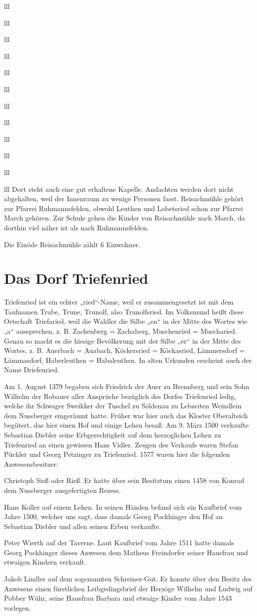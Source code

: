 \documentclass[12pt,a4pager]{book}
\begin{document}
\begin{tabuluar}{lll}
\begin{tabuluar}{lll}
\begin{tabuluar}{lll}
\begin{tabuluar}{lll}
\begin{tabuluar}{lll}
\begin{tabuluar}{lll}
\begin{tabuluar}{lll}
\begin{tabuluar}{lll}
\begin{tabuluar}{lll}
\begin{tabuluar}{lll}
\begin{tabuluar}{lll}
\begin{tabuluar}{lll}
Dort steht auch eine gut erhaltene Kapelle. Andachten werden dort nicht
abgehalten, weil der Innenraum zu wenige Personen fasst. Reisachmühle gehört zur
Pfarrei Ruhmannsfelden, obwohl Leuthen und Lobetsried schon zur Pfarrei March
gehören. Zur Schule gehen die Kinder von Reisachmühle nach March, da dorthin
viel näher ist als nach Ruhmannsfelden.

Die Einöde Reisachmühle zählt 6 Einwohner.

\section{Das Dorf Triefenried}

Triefenried ist ein echter „ried“-Name, weil er zusammengesetzt ist mit dem
Taufnamen Trube, Trune, Trunolf, also Trunolfsried. Im Volksmund heißt diese
Ortschaft Triefaried, weil die Waldler die Silbe „en“ in der Mitte des Wortes
wie „a“ aussprechen, z. B. Zachenberg = Zachaberg, Muschenried = Muscharied.
Genau so macht es die hiesige Bevölkerung mit der Silbe „er“ in der Mitte des
Wortes, z. B. Auerbach = Auabach, Köckersried = Köckasried, Lämmersdorf =
Lämmasdorf, Haberleuthen = Habaleuthen. In alten Urkunden erscheint auch der
Name Driefenried.

Am 1. August 1379 begaben sich Friedrich der Auer zu Brennberg und sein Sohn
Wilhelm der Robauer aller Ansprüche bezüglich des Dorfes Triefenried ledig,
welche ihr Schwager Sweikker der Tuschel zu Söldenau zu Lebzeiten Weindlein dem
Nussberger eingeräumt hatte. Früher war hier auch das Kloster Oberalteich
begütert, das hier einen Hof und einige Lehen besaß. Am 9. März 1500 verkaufte
Sebastian Diebler seine Erbgerechtigkeit auf dem herzoglichen Lehen zu
Triefenried an einen gewissen Hans Vidler. Zeugen des Verkaufs waren Stefan
Püchler und Georg Petzinger zu Triefenried. 1577 waren hier die folgenden
Anwesensbesitzer:

Christoph Sieß oder Rieß. Er hatte über sein Besitztum einen 1458 von Konrad dem
Nussberger ausgefertigten Rezess.

Hans Koller auf einem Lehen. In seinen Händen befand sich ein Kaufbrief vom
Jahre 1500, welcher uns sagt, dass damals Georg Pockhinger den Hof an Sebastian
Diebler und allen seinen Erben verkaufte.

Peter Wierth auf der Taverne. Laut Kaufbrief vom Jahre 1511 hatte damals Georg
Pockhinger dieses Anwesen dem Matheus Freindorfer seiner Hausfrau und etwaigen
Kindern verkauft.

Jakob Lindler auf dem sogenannten Schreiner-Gut. Er konnte über den Besitz des
Anwesens einen fürstlichen Leibgedingsbrief der Herzöge Wilhelm und Ludwig auf
Pobber Wühr, seine Hausfrau Barbara und etwaige Kinder vom Jahre 1543 vorlegen.


\end{tabuluar}
\end{tabuluar}
\end{tabuluar}
\end{tabuluar}
\end{tabuluar}
\end{tabuluar}
\end{tabuluar}
\end{tabuluar}
\end{tabuluar}
\end{tabuluar}
\end{tabuluar}
\end{tabuluar}
\end{document}
